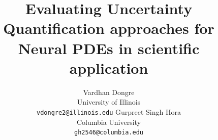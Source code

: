 \documentclass{article}
\title{Evaluating Uncertainty Quantification approaches for Neural PDEs in scientific application}
\author{Vardhan Dongre\\ University of Illinois \\ \texttt{vdongre2@illinois.edu} \And Gurpreet Singh Hora \\ Columbia University\\ \texttt{gh2546@columbia.edu}}
\begin{document}
\maketitle

\begin{abstract}


\end{abstract}
\end{document}
